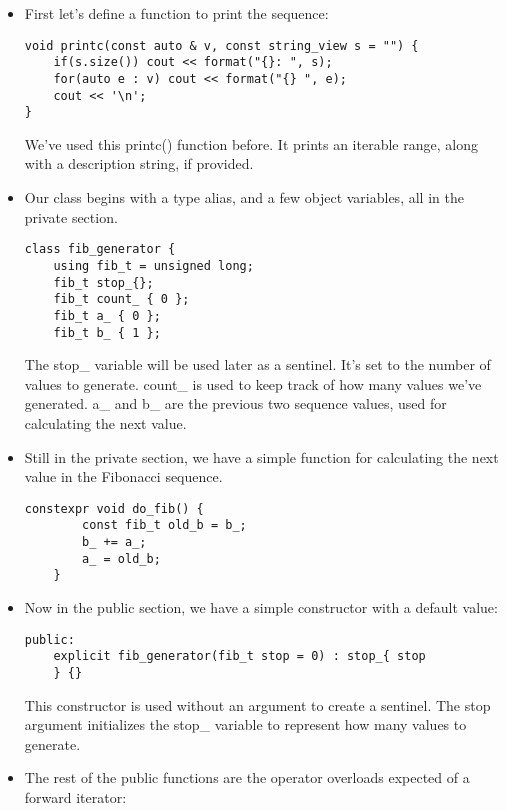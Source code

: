 \begin{itemize}
\item 
First let's define a function to print the sequence:

\begin{lstlisting}[style=styleCXX]
void printc(const auto & v, const string_view s = "") {
	if(s.size()) cout << format("{}: ", s);
	for(auto e : v) cout << format("{} ", e);
	cout << '\n';
}
\end{lstlisting}

We've used this printc() function before. It prints an iterable range, along with a description string, if provided.

\item 
Our class begins with a type alias, and a few object variables, all in the private section.

\begin{lstlisting}[style=styleCXX]
class fib_generator {
	using fib_t = unsigned long;
	fib_t stop_{};
	fib_t count_ { 0 };
	fib_t a_ { 0 };
	fib_t b_ { 1 };
\end{lstlisting}

The stop\_ variable will be used later as a sentinel. It's set to the number of values to generate. count\_ is used to keep track of how many values we've generated. a\_ and b\_ are the previous two sequence values, used for calculating the next value.

\item 
Still in the private section, we have a simple function for calculating the next value in the Fibonacci sequence.

\begin{lstlisting}[style=styleCXX]
	constexpr void do_fib() {
		const fib_t old_b = b_;
		b_ += a_;
		a_ = old_b;
	}
\end{lstlisting}

\item 
Now in the public section, we have a simple constructor with a default value:

\begin{lstlisting}[style=styleCXX]
public:
	explicit fib_generator(fib_t stop = 0) : stop_{ stop
	} {}
\end{lstlisting}

This constructor is used without an argument to create a sentinel. The stop argument initializes the stop\_ variable to represent how many values to generate.

\item 
The rest of the public functions are the operator overloads expected of a forward iterator:


\end{itemize}
